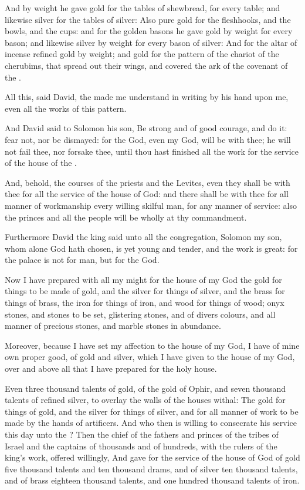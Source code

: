 \Verse And by weight he gave gold for the tables of shewbread, for every table; and likewise silver for the tables of silver: \Verse Also pure gold for the fleshhooks, and the bowls, and the cups: and for the golden basons he gave gold by weight for every bason; and likewise silver by weight for every bason of silver: \Verse And for the altar of incense refined gold by weight; and gold for the pattern of the chariot of the cherubims, that spread out their wings, and covered the ark of the covenant of the \LORD.

\Verse All this, said David, the \LORD made me understand in writing by his hand upon me, even all the works of this pattern.

\Verse And David said to Solomon his son, Be strong and of good courage, and do it: fear not, nor be dismayed: for the \LORD God, even my God, will be with thee; he will not fail thee, nor forsake thee, until thou hast finished all the work for the service of the house of the \LORD.

\Verse And, behold, the courses of the priests and the Levites, even they shall be with thee for all the service of the house of God: and there shall be with thee for all manner of workmanship every willing skilful man, for any manner of service: also the princes and all the people will be wholly at thy commandment.


\Chapter
\Verse Furthermore David the king said unto all the congregation, Solomon my son, whom alone God hath chosen, is yet young and tender, and the work is great: for the palace is not for man, but for the \LORD God.

\Verse Now I have prepared with all my might for the house of my God the gold for things to be made of gold, and the silver for things of silver, and the brass for things of brass, the iron for things of iron, and wood for things of wood; onyx stones, and stones to be set, glistering stones, and of divers colours, and all manner of precious stones, and marble stones in abundance.

\Verse Moreover, because I have set my affection to the house of my God, I have of mine own proper good, of gold and silver, which I have given to the house of my God, over and above all that I have prepared for the holy house.

\Verse Even three thousand talents of gold, of the gold of Ophir, and seven thousand talents of refined silver, to overlay the walls of the houses withal: \Verse The gold for things of gold, and the silver for things of silver, and for all manner of work to be made by the hands of artificers. And who then is willing to consecrate his service this day unto the \LORD?  \Verse Then the chief of the fathers and princes of the tribes of Israel and the captains of thousands and of hundreds, with the rulers of the king's work, offered willingly, \Verse And gave for the service of the house of God of gold five thousand talents and ten thousand drams, and of silver ten thousand talents, and of brass eighteen thousand talents, and one hundred thousand talents of iron.

